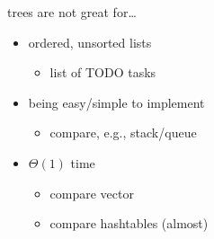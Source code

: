 \begin{frame}{trees are not great for\ldots}
    \begin{itemize}
        \item ordered, unsorted lists
            \begin{itemize}
            \item list of TODO tasks
            \end{itemize}
        \item being easy/simple to implement
            \begin{itemize}
            \item compare, e.g., stack/queue
            \end{itemize}
        \item $\Theta(1)$ time
            \begin{itemize}
            \item compare vector
            \item compare hashtables (almost)
            \end{itemize}
    \end{itemize}
\end{frame}
